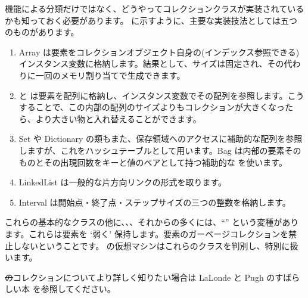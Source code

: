 \documentclass[a4paper,10pt,twoside]{book}
\begin{document}
機能による分類だけではなく、どうやってコレクションクラスが実装されているかも知っておく必要があります。 に示すように、主要な実装技法としては五つのものがあります。

\begin{enumerate}
  \item Array は要素をコレクションオブジェクト自身の(インデックス参照できる)インスタンス変数に格納します。結果として、サイズは固定され、その代わりに一回のメモリ割り当てで生成できます。
  \item {} と  は要素を配列に格納し、インスタンス変数でその配列を参照します。こうすることで、この内部の配列のサイズよりもコレクションが大きくなったら、より大きい物と入れ替えることができます。
  \item Set や Dictionary の類もまた、保存領域へのアクセスに補助的な配列を参照しますが、これをハッシュテーブルとして用います。Bag は内部の要素そのものとその出現回数をキーと値のペアとして持つ補助的な  を使います。
  \item LinkedList は一般的な片方向リンクの形式を取ります。
  \item Interval は開始点・終了点・ステップサイズの三つの整数を格納します。
\end{enumerate}
これらの基本的なクラスの他に、、、それからの多くには、``'' という変種があります。これらは要素を `弱く' 保持します。\ie 要素のガーベージコレクションを禁止しないということです。
\pharo の仮想マシンはこれらのクラスを判別し、特別に扱います。

\st のコレクションについてより詳しく知りたい場合は LaLonde と Pugh のすばらしい本\cite{LaLo90a} を参照してください。

\end{document}
